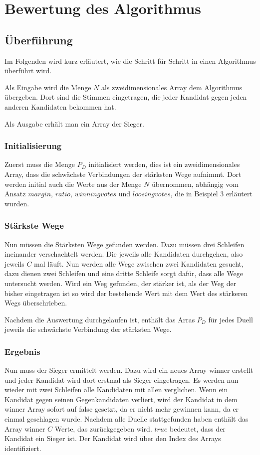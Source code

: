 \newpage
\section{Bewertung des Algorithmus}
\label{sec:Bewertung2}

\subsection{Überführung}
\label{sec:Ueberfuehrung}
Im Folgenden wird kurz erläutert, wie die \schulze Schritt für Schritt in einen Algorithmus überführt wird.

Als Eingabe wird die Menge $N$ als zweidimensionales Array dem Algorithmus übergeben. Dort sind die Stimmen eingetragen, die jeder Kandidat gegen jeden anderen Kandidaten bekommen hat.

Als Ausgabe erhält man ein Array der Sieger.

\subsubsection{Initialisierung}
\label{init}
Zuerst muss die Menge $P_{D}$ initialisiert werden, dies ist ein zweidimensionales Array, dass die schwächste Verbindungen der stärksten Wege aufnimmt. Dort werden initial auch die Werte aus der Menge $N$ übernommen, abhängig vom Ansatz $margin$, $ratio$, $winning votes$ und $loosing votes$, die in Beispiel 3 erläutert wurden.

\subsubsection{Stärkste Wege}
\label{starkeWege}
Nun müssen die Stärksten Wege gefunden werden. Dazu müssen drei Schleifen ineinander verschachtelt werden. Die jeweils alle Kandidaten durchgehen, also jeweils $C$ mal läuft. Nun werden alle Wege zwischen zwei Kandidaten gesucht, dazu dienen zwei Schleifen und eine dritte Schleife sorgt dafür, dass alle Wege untersucht werden. Wird ein Weg gefunden, der stärker ist, als der Weg der bisher eingetragen ist so wird der bestehende Wert mit dem Wert des stärkeren Wegs überschrieben.  

Nachdem die Auswertung durchgelaufen ist, enthält das Arras $P_{D}$ für jedes Duell jeweils die schwächste Verbindung der stärksten Wege.

\subsubsection{Ergebnis}
Nun muss der Sieger ermittelt werden. Dazu wird ein neues Array winner erstellt und jeder Kandidat wird dort erstmal als Sieger eingetragen. Es werden nun wieder mit zwei Schleifen alle Kandidaten mit allen verglichen. Wenn ein Kandidat gegen seinen Gegenkandidaten verliert, wird der Kandidat in dem winner Array sofort auf false gesetzt, da er nicht mehr gewinnen kann, da er einmal geschlagen wurde. Nachdem alle Duelle stattgefunden haben enthält das Array winner $C$ Werte, das zurückgegeben wird. $true$ bedeutet, dass der Kandidat ein Sieger ist. Der Kandidat wird über den Index des Arrays identifiziert.


